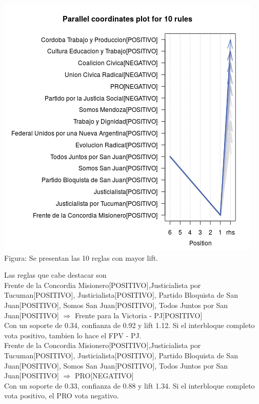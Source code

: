 \documentclass{endm}
\begin{document}
\begin{center}
\includegraphics[scale=0.5]{graficos/paracoordArgFedRestoPartidos.png} \\
\scriptsize{Figura: Se presentan las 10 reglas con mayor lift.} \\
\end{center} 

Las reglas que cabe destacar son \\

{Frente de la Concordia Misionero[POSITIVO],Justicialista por Tucuman[POSITIVO], Justicialista[POSITIVO], Partido Bloquista de San Juan[POSITIVO], Somos San Juan[POSITIVO], Todos Juntos por San Juan[POSITIVO]} $\Longrightarrow$ {Frente para la Victoria - PJ[POSITIVO]} \\

Con un soporte de 0.34, confianza de  0.92 y lift 1.12. Si el interbloque completo vota positivo, tambien lo hace el FPV - PJ. \\

{Frente de la Concordia Misionero[POSITIVO],Justicialista por Tucuman[POSITIVO], Justicialista[POSITIVO], Partido Bloquista de San Juan[POSITIVO], Somos San Juan[POSITIVO], Todos Juntos por San Juan[POSITIVO]} $\Longrightarrow$ {PRO[NEGATIVO]} \\

Con un soporte de 0.33, confianza de  0.88 y lift 1.34. Si el interbloque completo vota positivo, el PRO vota negativo. \\
\end{document}

